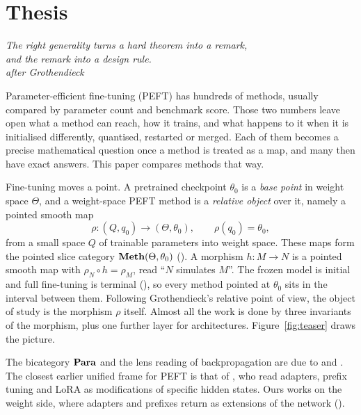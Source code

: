 \section{Thesis}\label{sec:thesis}

\begin{flushright}\small\itshape
The right generality turns a hard theorem into a remark,\\
and the remark into a design rule.\\[3pt]
{\upshape\footnotesize after Grothendieck}
\end{flushright}

Parameter-efficient fine-tuning (PEFT) has hundreds of methods, usually compared by parameter count and benchmark score. Those two numbers leave open what a method can reach, how it trains, and what happens to it when it is initialised differently, quantised, restarted or merged. Each of them becomes a precise mathematical question once a method is treated as a map, and many then have exact answers. This paper compares methods that way.

Fine-tuning moves a point. A pretrained checkpoint $\theta_0$ is a \emph{base point} in weight space $\Theta$, and a weight-space PEFT method is a \emph{relative object} over it, namely a pointed smooth map
\[
  \rho:(Q,q_0)\longrightarrow(\Theta,\theta_0),\qquad \rho(q_0)=\theta_0,
\]
from a small space $Q$ of trainable parameters into weight space. These maps form the pointed slice category $\mathbf{Meth}(\Theta,\theta_0)$ (). A morphism $h:M\to N$ is a pointed smooth map with $\rho_N\circ h=\rho_M$, read ``$N$ simulates $M$''. The frozen model is initial and full fine-tuning is terminal (), so every method pointed at $\theta_0$ sits in the interval between them. Following Grothendieck's relative point of view, the object of study is the morphism $\rho$ itself. Almost all the work is done by three invariants of the morphism, plus one further layer for architectures. Figure~\ref{fig:teaser} draws the picture.

The bicategory $\mathbf{Para}$ and the lens reading of backpropagation are due to \citet{fong2017backprop} and \citet{cruttwell2021categorical}. The closest earlier unified frame for PEFT is that of \citet{he2021unified}, who read adapters, prefix tuning and LoRA as modifications of specific hidden states. Ours works on the weight side, where adapters and prefixes return as extensions of the network ().

